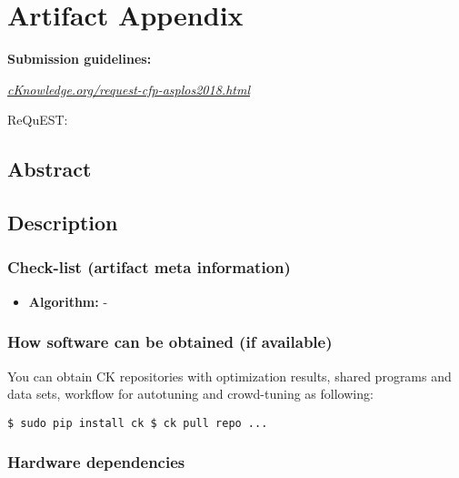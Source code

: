 \section{Artifact Appendix}
\label{artifact_appendix}

\textbf{Submission guidelines:}\begin{center}{\it \href{http://cknowledge.org/request-cfp-asplos2018.html}{cKnowledge.org/request-cfp-asplos2018.html}}\end{center}


ReQuEST: \cite{cm:29db2248aba45e59:0c7348dfbadd5b95}

\subsection{Abstract}


\subsection{Description}

\subsubsection{Check-list (artifact meta information)}

{\small
\begin{itemize}
  \item {\bf Algorithm:} -
\end{itemize}
}

\subsubsection{How software can be obtained (if available)}

You can obtain CK repositories with optimization results, shared programs and data sets, workflow for autotuning and crowd-tuning as following:

\begin{flushleft}
\texttt{\$ sudo pip install ck \newline
\$ ck pull repo ...}
\end{flushleft}

\subsubsection{Hardware dependencies}

